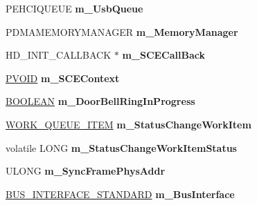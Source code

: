 \begin{DoxyCompactItemize}
\item 
\mbox{\label{class_c_u_s_b_hardware_device_a3e713e64c186e813e0a957de92f3ad67}} 
P\+E\+H\+C\+I\+Q\+U\+E\+UE {\bfseries m\+\_\+\+Usb\+Queue}
\item 
\mbox{\label{class_c_u_s_b_hardware_device_a2628ce65c45c4158dead2c9f971f6a14}} 
P\+D\+M\+A\+M\+E\+M\+O\+R\+Y\+M\+A\+N\+A\+G\+ER {\bfseries m\+\_\+\+Memory\+Manager}
\item 
\mbox{\label{class_c_u_s_b_hardware_device_a07ed555764fb92330003c1e36f985e71}} 
H\+D\+\_\+\+I\+N\+I\+T\+\_\+\+C\+A\+L\+L\+B\+A\+CK $\ast$ {\bfseries m\+\_\+\+S\+C\+E\+Call\+Back}
\item 
\mbox{\label{class_c_u_s_b_hardware_device_acfa81b2d57b64c799fc5c015e16f2785}} 
\hyperlink{interfacevoid}{P\+V\+O\+ID} {\bfseries m\+\_\+\+S\+C\+E\+Context}
\item 
\mbox{\label{class_c_u_s_b_hardware_device_ae6aa1572319b0be1c89542bf2e8266a8}} 
\hyperlink{_processor_bind_8h_a112e3146cb38b6ee95e64d85842e380a}{B\+O\+O\+L\+E\+AN} {\bfseries m\+\_\+\+Door\+Bell\+Ring\+In\+Progress}
\item 
\mbox{\label{class_c_u_s_b_hardware_device_a4da633d1c8cc4f3d985ad9d0477aad44}} 
\hyperlink{struct___w_o_r_k___q_u_e_u_e___i_t_e_m}{W\+O\+R\+K\+\_\+\+Q\+U\+E\+U\+E\+\_\+\+I\+T\+EM} {\bfseries m\+\_\+\+Status\+Change\+Work\+Item}
\item 
\mbox{\label{class_c_u_s_b_hardware_device_a2387dff2d0b2fbcf36997fee9aa15253}} 
volatile L\+O\+NG {\bfseries m\+\_\+\+Status\+Change\+Work\+Item\+Status}
\item 
\mbox{\label{class_c_u_s_b_hardware_device_aa53ab84d8409ce211015eb083fa14583}} 
U\+L\+O\+NG {\bfseries m\+\_\+\+Sync\+Frame\+Phys\+Addr}
\item 
\mbox{\label{class_c_u_s_b_hardware_device_a2f04780e7b6a7ee8b3f4e2b03e07a15b}} 
\hyperlink{struct___b_u_s___i_n_t_e_r_f_a_c_e___s_t_a_n_d_a_r_d}{B\+U\+S\+\_\+\+I\+N\+T\+E\+R\+F\+A\+C\+E\+\_\+\+S\+T\+A\+N\+D\+A\+RD} {\bfseries m\+\_\+\+Bus\+Interface}

\end{DoxyCompactItemize}
